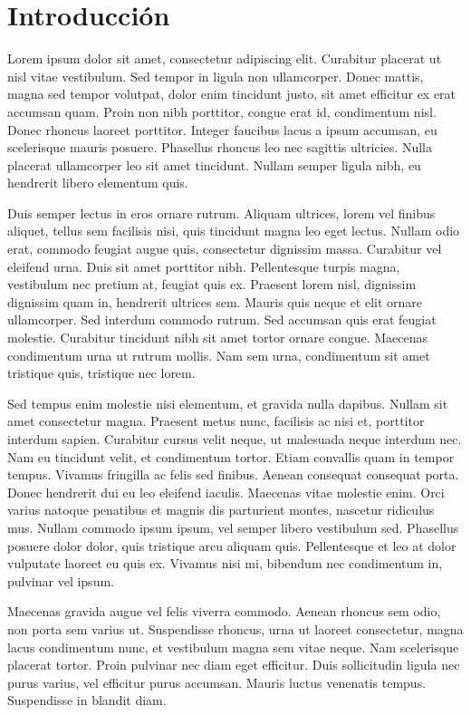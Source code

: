 \section{Introducci\'on}

Lorem ipsum dolor sit amet, consectetur adipiscing elit. Curabitur
placerat ut nisl vitae vestibulum. Sed tempor in ligula non ullamcorper.
Donec mattis, magna sed tempor volutpat, dolor enim tincidunt justo, 
sit amet efficitur ex erat accumsan quam. Proin non nibh porttitor, 
congue erat id, condimentum nisl. Donec rhoncus laoreet porttitor. 
Integer faucibus lacus a ipsum accumsan, eu scelerisque mauris posuere. 
Phasellus rhoncus leo nec sagittis ultricies. Nulla placerat ullamcorper 
leo sit amet tincidunt. Nullam semper ligula nibh, eu hendrerit 
libero elementum quis.

Duis semper lectus in eros ornare rutrum. Aliquam ultrices, lorem 
vel finibus aliquet, tellus sem facilisis nisi, quis tincidunt 
magna leo eget lectus. Nullam odio erat, commodo feugiat augue 
quis, consectetur dignissim massa. Curabitur vel eleifend urna. 
Duis sit amet porttitor nibh. Pellentesque turpis magna, vestibulum 
nec pretium at, feugiat quis ex. Praesent lorem nisl, dignissim 
dignissim quam in, hendrerit ultrices sem. Mauris quis neque et 
elit ornare ullamcorper. Sed interdum commodo rutrum. Sed accumsan 
quis erat feugiat molestie. Curabitur tincidunt nibh sit amet tortor
ornare congue. Maecenas condimentum urna ut rutrum mollis. Nam sem 
urna, condimentum sit amet tristique quis, tristique nec lorem.

Sed tempus enim molestie nisi elementum, et gravida nulla dapibus. 
Nullam sit amet consectetur magna. Praesent metus nunc, facilisis 
ac nisi et, porttitor interdum sapien. Curabitur cursus velit neque, 
ut malesuada neque interdum nec. Nam eu tincidunt velit, et condimentum 
tortor. Etiam convallis quam in tempor tempus. Vivamus fringilla 
ac felis sed finibus. Aenean consequat consequat porta. Donec hendrerit 
dui eu leo eleifend iaculis. Maecenas vitae molestie enim. Orci varius 
natoque penatibus et magnis dis parturient montes, nascetur ridiculus 
mus. Nullam commodo ipsum ipsum, vel semper libero vestibulum sed. 
Phasellus posuere dolor dolor, quis tristique arcu aliquam quis. 
Pellentesque et leo at dolor vulputate laoreet eu quis ex. 
Vivamus nisi mi, bibendum nec condimentum in, pulvinar vel ipsum.

Maecenas gravida augue vel felis viverra commodo. Aenean rhoncus sem 
odio, non porta sem varius ut. Suspendisse rhoncus, urna ut laoreet 
consectetur, magna lacus condimentum nunc, et vestibulum magna sem 
vitae neque. Nam scelerisque placerat tortor. Proin pulvinar nec diam 
eget efficitur. Duis sollicitudin ligula nec purus varius, vel 
efficitur purus accumsan. Mauris luctus venenatis tempus. Suspendisse 
in blandit diam.

